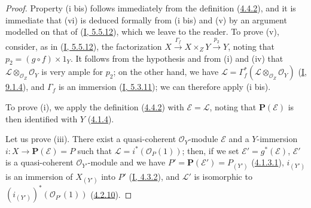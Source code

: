\begin{proof}
Property (i bis) follows immediately from the definition
(\hyperref[II.4.4.2]{4.4.2}), and it is immediate that (vi) is deduced
formally from (i bis) and (v) by an argument modelled on that of
(\hyperref[I.5.5.12]{I, 5.5.12}), which we leave to the reader. To
prove (v), consider, as in
(\hyperref[I.5.5.12]{I, 5.5.12}), the factorization
$X\xrightarrow{\Gamma_f}X\times_ZY\xrightarrow{p_2}Y$, noting that
$p_2=(g\circ f)\times1_Y$. It follows from the hypothesis and from (i) and (iv)
that $\mathcal{L}\otimes_{\mathcal{O}_Z}\mathcal{O}_Y$ is very ample for
$p_2$; on the other hand, we have
$\mathcal{L}=\Gamma_f^*(\mathcal{L}\otimes_{\mathcal{O}_Z}\mathcal{O}_Y)$
(\hyperref[I.9.1.4]{I, 9.1.4}), and $\Gamma_f$ is an immersion
(\hyperref[I.5.3.11]{I, 5.3.11}); we can therefore apply (i bis).


To prove (i), we apply the definition
(\hyperref[II.4.4.2]{4.4.2}) with $\mathcal{E}=\mathcal{L}$, noting
that $\mathbf{P}(\mathcal{E})$ is then identified with $Y$
(\hyperref[II.4.1.4]{4.1.4}).

Let us prove (iii). There exist a quasi-coherent $\mathcal{O}_Y$-module
$\mathcal{E}$ and a $Y$-immersion $i:X\to\mathbf{P}(\mathcal{E})=P$ such
that $\mathcal{L}=i^*(\mathcal{O}_P(1))$; then, if we set
$\mathcal{E}'=g^*(\mathcal{E})$, $\mathcal{E}'$ is a quasi-coherent
$\mathcal{O}_{Y'}$-module and we have
$P'=\mathbf{P}(\mathcal{E}')=P_{(Y')}$
(\hyperref[II.4.1.3.1]{4.1.3.1}), $i_{(Y')}$ is an immersion of
$X_{(Y')}$ into $P'$ (\hyperref[I.4.3.2]{I, 4.3.2}), and $\mathcal{L}'$ is
isomorphic to $(i_{(Y')})^*(\mathcal{O}_{P'}(1))$
(\hyperref[II.4.2.10]{4.2.10}).


\end{proof}
